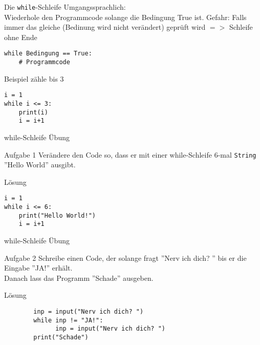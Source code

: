 \begin{frame}[fragile]{Die \texttt{while}-Schleife}
	Umgangssprachlich:\\
	Wiederhole den Programmcode solange die Bedingung True ist.
	Gefahr: Falls immer das gleiche (Bedinung wird nicht verändert) geprüft wird $=>$ Schleife ohne Ende

    \begin{lstlisting}
while Bedingung == True:
    # Programmcode

    \end{lstlisting}
    
    Beispiel zähle bis 3
    \begin{lstlisting}
i = 1
while i <= 3:
    print(i)
    i = i+1   
    \end{lstlisting}
   
\end{frame}

\begin{frame}[fragile]{while-Schleife Übung}
\begin{block}{Aufgabe 1}
	Verändere den Code so, dass er mit einer while-Schleife 6-mal \texttt{String} ''Hello World'' ausgibt.
\end{block}
\pause{}
\begin{exampleblock}{Lösung}
	\begin{lstlisting}		 
i = 1
while i <= 6:
	print("Hello World!")
	i = i+1   		
	\end{lstlisting}
\end{exampleblock}
\end{frame}

\begin{frame}[fragile]{while-Schleife Übung}
\begin{block}{Aufgabe 2}
	Schreibe einen Code, der solange fragt ''Nerv ich dich? '' bis er die Eingabe ''JA!'' erhält.\\
	Danach lass das Programm ''Schade'' ausgeben.
	
\end{block}
\pause{}
\begin{exampleblock}{Lösung}
	\begin{lstlisting}		 
		inp = input("Nerv ich dich? ")
		while inp != "JA!":
			  inp = input("Nerv ich dich? ")
		print("Schade")	
	\end{lstlisting}
\end{exampleblock}
\end{frame}



